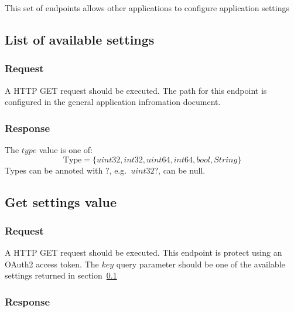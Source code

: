 This set of endpoints allows other applications to configure application settings

\subsection{List of available settings}
\label{subsec:list-of-available-settings}

\subsubsection{Request}
A HTTP GET request should be executed.
The path for this endpoint is configured in the general application infromation document.

\subsubsection{Response}

The $type$ value is one of:
\begin{equation}
    \label{eq:response-list-of-available-settings}
    \text{Type} = \{uint32, int32, uint64, int64, bool, String\}
\end{equation}
Types can be annoted with $?$, e.g.\ $uint32?$, can be null.




\subsection{Get settings value}
\label{subsec:get-settings-value}

\subsubsection{Request}

A HTTP GET request should be executed.
This endpoint is protect using an OAuth2 access token.
The $key$ query parameter should be one of the available settings returned in section\ \ref{subsec:list-of-available-settings}



\subsubsection{Response}




